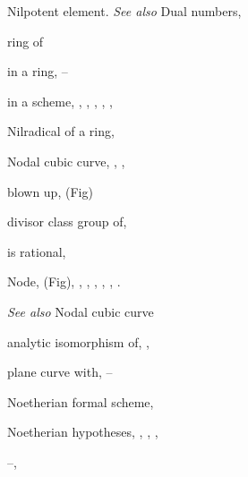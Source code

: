 {{\noindent\hspace*{0.0bp}Nilpotent element. \emph{See also} Dual numbers,\par
\noindent\hspace*{15.0bp}ring of\par
\noindent\hspace*{7.5bp}in a ring, --\par
\noindent\hspace*{7.5bp}in a scheme, , , , , , \par
\noindent\hspace*{0.0bp}Nilradical of a ring, \par
\noindent\hspace*{0.0bp}Nodal cubic curve, , , \par
\noindent\hspace*{7.5bp}blown up,  (Fig)\par
\noindent\hspace*{7.5bp}divisor class group of, \par
\noindent\hspace*{7.5bp}is rational, \par
\noindent\hspace*{0.0bp}Node,  (Fig), , , , , , .\par
\noindent\hspace*{15.0bp}\emph{See also} Nodal cubic curve\par
\noindent\hspace*{7.5bp}analytic isomorphism of, , \par
\noindent\hspace*{7.5bp}plane curve with, --\par
\noindent\hspace*{0.0bp}Noetherian formal scheme, \par
\noindent\hspace*{0.0bp}Noetherian hypotheses, , , ,\par
\noindent\hspace*{15.0bp}--, \par
}}
